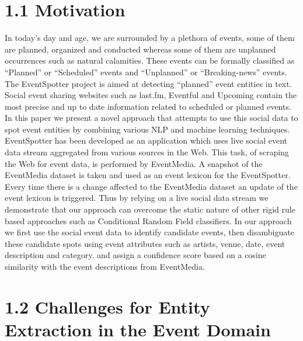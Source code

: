 \documentclass[a4paper,11pt]{report}
\begin{document}
\section*{1.1 Motivation}
In today's day and age, we are surrounded by a plethora of events, some of them are planned, organized and conducted whereas some of them are unplanned occurrences such as natural calamities. These events can be formally classified as ``Planned'' or ``Scheduled'' events and ``Unplanned'' or ``Breaking-news'' events. The EventSpotter project is aimed at detecting ``planned'' event entities in text. Social event sharing websites such as last.fm, Eventful and Upcoming contain the most precise and up to date information related to scheduled or planned events. In this paper we present a novel approach that attempts to use this social data to spot event entities by combining various NLP and machine learning techniques. EventSpotter has been developed as an application which uses live social event data stream aggregated from various sources in the Web. This task, of scraping the Web for event data, is performed by EventMedia\cite{EURECOM+3865}. A snapshot of the EventMedia dataset is taken and used as an event lexicon for the EventSpotter. Every time there is a change affected to the EventMedia dataset an update of the event lexicon is triggered. Thus by relying on a live social data stream we demonstrate that our approach can overcome the static nature of other rigid rule based approaches such as Conditional Random Field classifiers. In our approach we first use the social event data to identify candidate events, then disambiguate these candidate spots using event attributes such as artists, venue, date, event description and category. and assign a confidence score based on a cosine similarity with the event descriptions from EventMedia. 

\section*{1.2 Challenges for Entity Extraction in the Event Domain}
\end{document}
